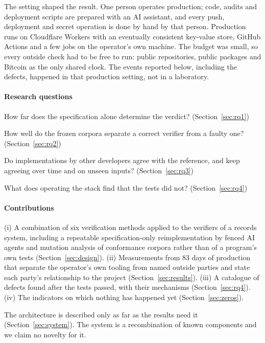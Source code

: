 \documentclass[preprint,12pt,authoryear]{elsarticle}
\begin{document}
The setting shaped the result. One person operates production; code, audits and deployment scripts are prepared with an AI assistant, and every push, deployment and secret operation is done by hand by that person. Production runs on Cloudflare Workers with an eventually consistent key-value store, GitHub Actions and a few jobs on the operator's own machine. The budget was small, so every outside check had to be free to run: public repositories, public packages and Bitcoin as the only shared clock. The events reported below, including the defects, happened in that production setting, not in a laboratory.

\paragraph{Research questions}
\begin{description}[leftmargin=3.2em,style=nextline]
\item[RQ1] How far does the specification alone determine the verdict? (Section~\ref{sec:rq1})
\item[RQ2] How well do the frozen corpora separate a correct verifier from a faulty one? (Section~\ref{sec:rq2})
\item[RQ3] Do implementations by other developers agree with the reference, and keep agreeing over time and on unseen inputs? (Section~\ref{sec:rq3})
\item[RQ4] What does operating the stack find that the tests did not? (Section~\ref{sec:rq4})
\end{description}

\paragraph{Contributions} (i) A combination of six verification methods applied to the verifiers of a records system, including a repeatable specification-only reimplementation by fenced AI agents and mutation analysis of conformance corpora rather than of a program's own tests (Section~\ref{sec:design}). (ii) Measurements from 83 days of production that separate the operator's own tooling from named outside parties and state each party's relationship to the project (Section~\ref{sec:results}). (iii) A catalogue of defects found after the tests passed, with their mechanisms (Section~\ref{sec:rq4}). (iv) The indicators on which nothing has happened yet (Section~\ref{sec:zeros}).

The architecture is described only as far as the results need it (Section~\ref{sec:system}). The system is a recombination of known components and we claim no novelty for it.
\end{document}
